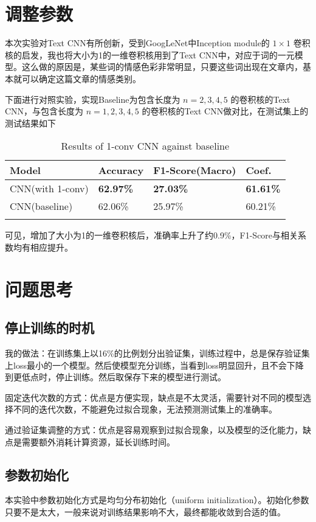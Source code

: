 \documentclass[12pt,a4paper]{article}
\begin{document}
\section{调整参数}

本次实验对Text CNN有所创新，受到GoogLeNet中Inception module的
\(1\times 1\) 卷积核的启发，我也将大小为1的一维卷积核用到了Text
CNN中，对应于词的一元模型。这么做的原因是，某些词的情感色彩非常明显，只要这些词出现在文章内，基本就可以确定这篇文章的情感类别。

下面进行对照实验，实现Baseline为包含长度为 \(n=2,3,4,5\) 的卷积核的Text CNN，与包含长度为 \(n=1,2,3,4,5\) 的卷积核的Text CNN做对比，在测试集上的测试结果如下

\begin{longtable}[]{llll}
\toprule
Model & Accuracy & F1-Score(Macro) & Coef.\tabularnewline
\midrule
\endhead
CNN(with 1-conv) & \textbf{62.97\%} & \textbf{27.03\%} & \textbf{61.61\%}\tabularnewline
CNN(baseline) & 62.06\% & 25.97\% & 60.21\%\tabularnewline
\bottomrule
\caption{Results of 1-conv CNN against baseline}
\end{longtable}

可见，增加了大小为1的一维卷积核后，准确率上升了约0.9\%，F1-Score与相关系数均有相应提升。

\section{问题思考}

\subsection{停止训练的时机}

我的做法：在训练集上以16\%的比例划分出验证集，训练过程中，总是保存验证集上loss最小的一个模型。然后使模型充分训练，当看到loss明显回升，且不会下降到更低点时，停止训练。然后取保存下来的模型进行测试。

固定迭代次数的方式：优点是方便实现，缺点是不太灵活，需要针对不同的模型选择不同的迭代次数，不能避免过拟合现象，无法预测测试集上的准确率。

通过验证集调整的方式：优点是容易观察到过拟合现象，以及模型的泛化能力，缺点是需要额外消耗计算资源，延长训练时间。

\subsection{参数初始化}

本实验中参数初始化方式是均匀分布初始化（uniform initialization）。初始化参数只要不是太大，一般来说对训练结果影响不大，最终都能收敛到合适的值。
\end{document}
